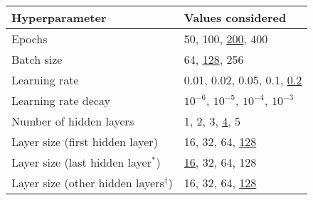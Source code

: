 \begin{tabular}{ll}
  \toprule
  Hyperparameter & Values considered \\
  \midrule
  Epochs & 50, 100, \underline{200}, 400 \\[0.1em]
  Batch size & 64, \underline{128}, 256 \\[0.1em]
  Learning rate & 0.01, 0.02, 0.05, 0.1, \underline{0.2} \\[0.1em]
  Learning rate decay & $10^{-6}$, \underline{$10^{-5}$}, $10^{-4}$, $10^{-3}$ \\[0.1em]
  Number of hidden layers & 1, 2, 3, \underline{4}, 5 \\[0.1em]
  Layer size (first hidden layer) & 16, 32, 64, \underline{128} \\[0.1em]
  Layer size (last hidden layer$^*$) & \underline{16}, 32, 64, 128 \\
  Layer size (other hidden layers$^\dagger$) & 16, 32, 64, \underline{128} \\[0.1em]
  \bottomrule
\end{tabular}

